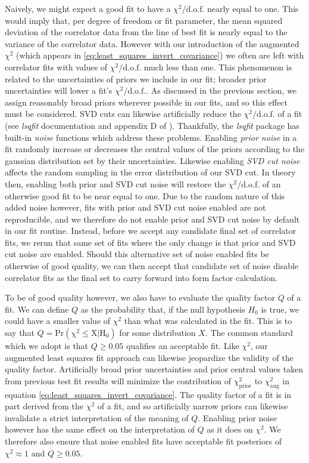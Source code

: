 Naively, we might expect a good fit to have a $\chi^2/\mathrm{d.o.f.}$ nearly equal to one.  This would imply that, per degree of freedom or fit parameter, the mean squared deviation of the correlator data from the line of best fit is nearly equal to the variance of the correlator data. However with our introduction of the augmented $\chi^2$ (which appears in \ref{eq:least_squares_invert_covariance}) we often are left with correlator fits with values of $\chi^2/\mathrm{d.o.f.}$ much less than one.  This phenomenon is related to the uncertainties of priors we include in our fit; broader prior uncertainties will  lower a fit's $\chi^2/\mathrm{d.o.f.}$.  As discussed in the previous section, we assign reasonably broad priors wherever possible in our fits, and so this effect must be considered. SVD cuts can likewise artificially reduce the $\chi^2/\mathrm{d.o.f.}$ of a fit (see \textit{lsqfit} documentation \cite{peter_lepage_2024_12690493} and appendix D of \cite{Dowdall_2019}).  Thankfully, the \textit{lsqfit} package has built-in \textit{noise} functions which address these problems.  Enabling \textit{prior noise} in a fit randomly increase or decreases the central values of the priors according to the gaussian distribution set by their uncertainties.  Likewise enabling \textit{SVD cut noise} affects the random sampling in the error distribution of our SVD cut.  In theory then, enabling both prior and SVD cut noise will restore the $\chi^2/\mathrm{d.o.f.}$ of an otherwise good fit to be near equal to one.  Due to the random nature of this added noise however, fits with prior and SVD cut noise enabled are not reproducible, and we therefore do not enable prior and SVD cut noise by default in our fit routine.  Instead, before we accept any candidate final set of correlator fits, we rerun that same set of fits where the only change is that prior and SVD cut noise are enabled.  Should this alternative set of noise enabled fits be otherwise of good quality, we can then accept that candidate set of noise disable correlator fits as the final set to carry forward into form factor calculation. 

To be of good quality however, we also have to evaluate the quality factor $Q$ of a fit. We can define $Q$ as the probability that, if the null hypothesis $H_0$ is true, we could have a smaller value of $\chi^2$ than what was calculated in the fit.  This is to say that $Q = \mathrm{Pr\left(\chi^2 \leq X|H_0\right)}$ for some distribution $X$.  The common standard which we adopt is that $Q\geq 0.05$ qualifies an acceptable fit.  Like $\chi^2$, our augmented least squares fit approach can likewise jeopardize the validity of the quality factor.  Artificially broad prior uncertainties and prior central values taken from previous test fit results will minimize the contribution of $\chi^2_\mathrm{prior}$ to $\chi^2_\mathrm{aug}$ in equation \ref{eq:least_squares_invert_covariance}.  The quality factor of a fit is in part derived from the $\chi^2$ of a fit, and so artificially narrow priors can likewise invalidate a strict interpretation of the meaning of $Q$.  Enabling prior noise however has the same effect on the interpretation of $Q$ as it does on $\chi^2$.  We therefore also ensure that noise enabled fits have acceptable fit posteriors of $\chi^2 \approx 1$ and $Q\geq 0.05$.

